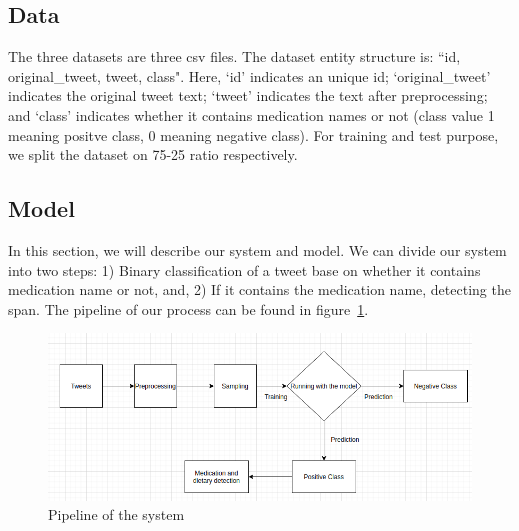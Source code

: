 \subsection{Data}
The three datasets are three csv files. The dataset entity structure is: ``id, original\_tweet, tweet, class". Here, `id' indicates an unique id; `original\_tweet' indicates the original tweet text; `tweet' indicates the text after preprocessing; and `class' indicates whether it contains medication names or not (class value 1 meaning positve class, 0 meaning negative class). For training and test purpose, we split the dataset on 75-25 ratio respectively.

\subsection{Model}
In this section, we will describe our system and model. We can divide our system into two steps: 1) Binary classification of a tweet base on whether it contains medication name or not, and, 2) If it contains the medication name, detecting the span. The pipeline of our process can be found in figure~\ref{fig:system-imran}.

\begin{figure}[h]
	\centering
	\includegraphics[width=0.99\linewidth]{Figures/system.png}
	\caption{Pipeline of the system}
	\label{fig:system-imran}
\end{figure}
